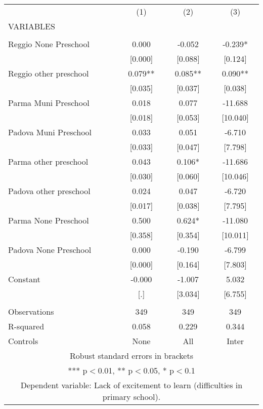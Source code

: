 \begin{tabular}{lccc} \hline
 & (1) & (2) & (3) \\
VARIABLES &  &  &  \\ \hline
 &  &  &  \\
Reggio None Preschool & 0.000 & -0.052 & -0.239* \\
 & [0.000] & [0.088] & [0.124] \\
Reggio other preschool & 0.079** & 0.085** & 0.090** \\
 & [0.035] & [0.037] & [0.038] \\
Parma Muni Preschool & 0.018 & 0.077 & -11.688 \\
 & [0.018] & [0.053] & [10.040] \\
Padova Muni Preschool & 0.033 & 0.051 & -6.710 \\
 & [0.033] & [0.047] & [7.798] \\
Parma other preschool & 0.043 & 0.106* & -11.686 \\
 & [0.030] & [0.060] & [10.046] \\
Padova other preschool & 0.024 & 0.047 & -6.720 \\
 & [0.017] & [0.038] & [7.795] \\
Parma None Preschool & 0.500 & 0.624* & -11.080 \\
 & [0.358] & [0.354] & [10.011] \\
Padova None Preschool & 0.000 & -0.190 & -6.799 \\
 & [0.000] & [0.164] & [7.803] \\
Constant & -0.000 & -1.007 & 5.032 \\
 & [.] & [3.034] & [6.755] \\
 &  &  &  \\
Observations & 349 & 349 & 349 \\
R-squared & 0.058 & 0.229 & 0.344 \\
 Controls & None & All & Inter \\ \hline
\multicolumn{4}{c}{ Robust standard errors in brackets} \\
\multicolumn{4}{c}{ *** p$<$0.01, ** p$<$0.05, * p$<$0.1} \\
\multicolumn{4}{c}{ Dependent variable: Lack of excitement to learn (difficulties in primary school).} \\
\end{tabular}
